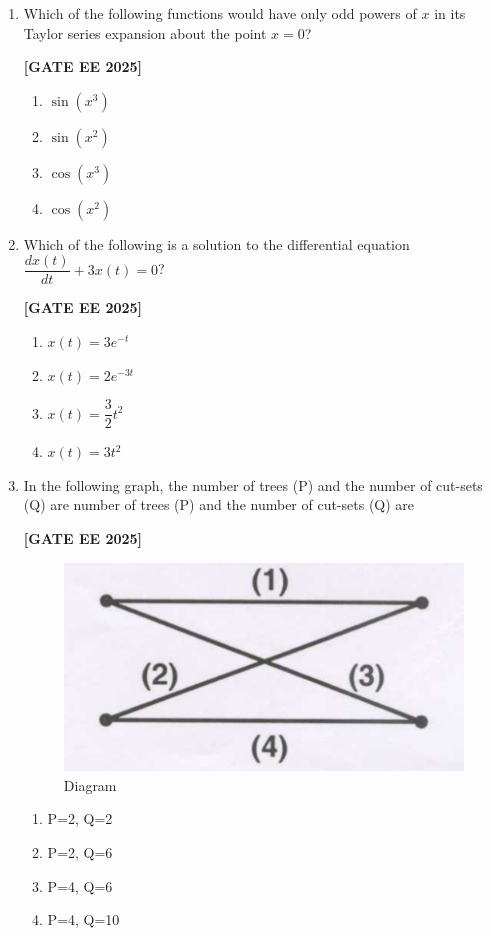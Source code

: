 \documentclass[12pt]{article}
\begin{document}
\begin{enumerate}[leftmargin=2.5em, label=\textbf{Q.\arabic*}., itemsep=2em]
\item Which of the following functions would have only odd powers of $x$ in its Taylor series expansion about the point $x = 0$?
 
\noindent \textbf{[GATE EE 2025]}
    \begin{enumerate}
        \item $\sin(x^3)$
        \item $\sin(x^2)$
        \item $\cos(x^3)$
        \item $\cos(x^2)$
    \end{enumerate}

\item Which of the following is a solution to the differential equation $\dfrac{dx(t)}{dt} + 3x(t) = 0$?
 
\noindent \textbf{[GATE EE 2025]}
    \begin{enumerate}
        \item $x(t) = 3e^{-t}$
        \item $x(t) = 2e^{-3t}$
        \item $x(t) = \dfrac{3}{2} t^2$
        \item $x(t) = 3t^2$
    \end{enumerate}

\item In the following graph, the number of trees (P) and the number of cut-sets (Q) are
number of trees (P) and the number of cut-sets (Q) are
 
\noindent \textbf{[GATE EE 2025]}
\begin{figure}[H]\centering
\includegraphics[width=0.5\columnwidth]{figs/q7.png}
\caption{Diagram}
\label{fig:q7}
\end{figure}
    \begin{enumerate}
        \item P=2, Q=2
        \item P=2, Q=6
        \item P=4, Q=6
        \item P=4, Q=10
    \end{enumerate}


\end{enumerate}
\end{document}
